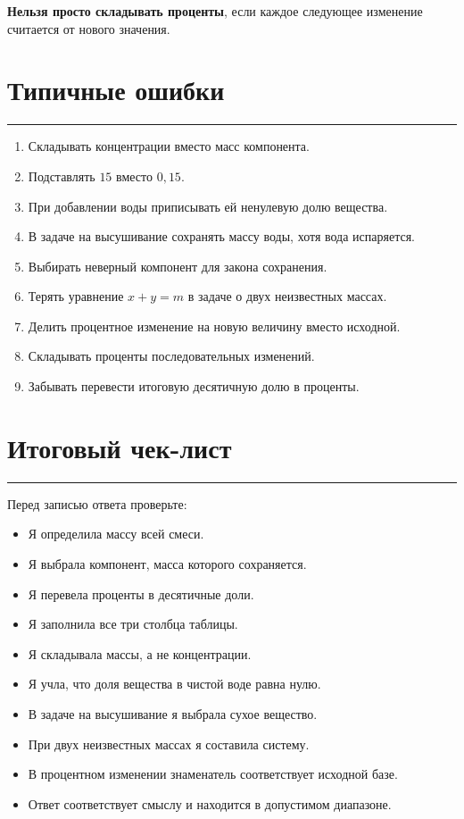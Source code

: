 \documentclass[a4paper,12pt]{article}
\newcommand{\sectionline}{%
  \par\vspace{2pt}
  {\color{accent}\rule{\linewidth}{0.7pt}}
  \vspace{4pt}
}
\newcommand{\warning}[1]{\textcolor{warm}{\textbf{#1}}}
\begin{document}
\warning{Нельзя просто складывать проценты}, если каждое следующее изменение
считается от нового значения.

\section{Типичные ошибки}
\sectionline

\begin{enumerate}[leftmargin=8mm]
  \item Складывать концентрации вместо масс компонента.
  \item Подставлять $15$ вместо $0{,}15$.
  \item При добавлении воды приписывать ей ненулевую долю вещества.
  \item В задаче на высушивание сохранять массу воды, хотя вода испаряется.
  \item Выбирать неверный компонент для закона сохранения.
  \item Терять уравнение $x+y=m$ в задаче о двух неизвестных массах.
  \item Делить процентное изменение на новую величину вместо исходной.
  \item Складывать проценты последовательных изменений.
  \item Забывать перевести итоговую десятичную долю в проценты.
\end{enumerate}

\section{Итоговый чек-лист}
\sectionline

Перед записью ответа проверьте:
\begin{itemize}[leftmargin=8mm,label=$\square$]
  \item Я определила массу всей смеси.
  \item Я выбрала компонент, масса которого сохраняется.
  \item Я перевела проценты в десятичные доли.
  \item Я заполнила все три столбца таблицы.
  \item Я складывала массы, а не концентрации.
  \item Я учла, что доля вещества в чистой воде равна нулю.
  \item В задаче на высушивание я выбрала сухое вещество.
  \item При двух неизвестных массах я составила систему.
  \item В процентном изменении знаменатель соответствует исходной базе.
  \item Ответ соответствует смыслу и находится в допустимом диапазоне.
\end{itemize}
\end{document}
